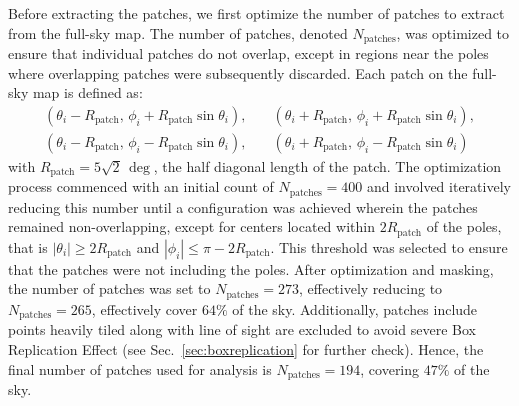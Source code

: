 Before extracting the patches, we first optimize the number of patches to extract from the full-sky map. The number of patches, denoted \( N_{\text{patches}} \), was optimized to ensure that individual patches do not overlap, except in regions near the poles where overlapping patches were subsequently discarded. 
Each patch on the full-sky map is defined as:
\begin{align}
    \left( \theta_i - R_{\text{patch}},\, \phi_i + R_{\text{patch}} \sin \theta_i \right),  \quad & \left( \theta_i + R_{\text{patch}},\, \phi_i + R_{\text{patch}} \sin \theta_i \right), \nonumber \\
    \left( \theta_i - R_{\text{patch}},\, \phi_i - R_{\text{patch}} \sin \theta_i \right), \quad &
    \left( \theta_i + R_{\text{patch}},\, \phi_i - R_{\text{patch}} \sin \theta_i \right)
\end{align}
with \( R_{\text{patch}} = 5\sqrt{2}\, \mathrm{\deg} \), the half diagonal length of the patch.
The optimization process commenced with an initial count of \( N_{\text{patches}} = 400 \) and involved iteratively reducing this number until a configuration was achieved wherein the patches remained non-overlapping, except for centers located within \( 2R_{\text{patch}}\) of the poles, that is $|\theta_i| \geq 2R_{\text{patch}}$ and $|\phi_i| \leq \pi - 2R_{\text{patch}}$. This threshold was selected to ensure that the patches were not including the poles.
After optimization and masking, the number of patches was set to $N_{\text{patches}} = 273$, effectively reducing to $N_{\text{patches}} = 265$, effectively cover $64 \%$ of the sky. Additionally, patches include points heavily tiled along with line of sight are excluded to avoid severe Box Replication Effect (see Sec.~\ref{sec:boxreplication} for further check). Hence, the final number of patches used for analysis is $N_{\text{patches}} = 194$, covering $47 \%$ of the sky.


